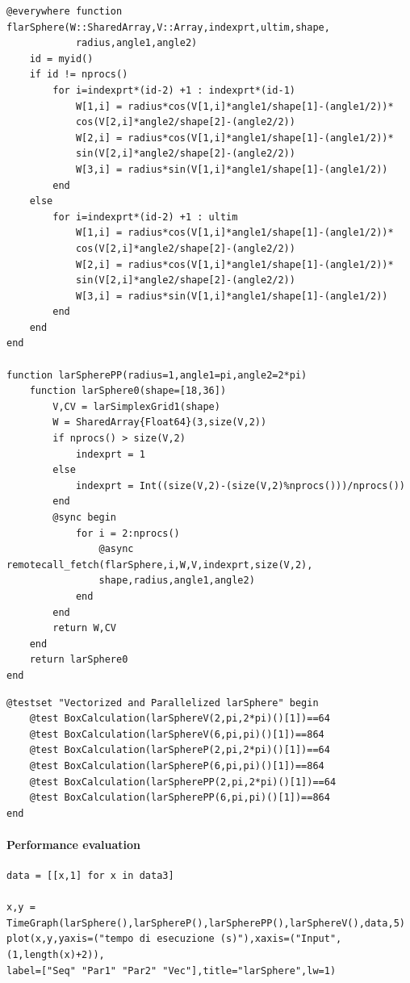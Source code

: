 \documentclass{article}
\begin{document}
\begin{Verbatim}
@everywhere function flarSphere(W::SharedArray,V::Array,indexprt,ultim,shape,
            radius,angle1,angle2)
    id = myid()
    if id != nprocs()
        for i=indexprt*(id-2) +1 : indexprt*(id-1)
            W[1,i] = radius*cos(V[1,i]*angle1/shape[1]-(angle1/2))*
            cos(V[2,i]*angle2/shape[2]-(angle2/2))
            W[2,i] = radius*cos(V[1,i]*angle1/shape[1]-(angle1/2))*
            sin(V[2,i]*angle2/shape[2]-(angle2/2))
            W[3,i] = radius*sin(V[1,i]*angle1/shape[1]-(angle1/2))
        end
    else
        for i=indexprt*(id-2) +1 : ultim
            W[1,i] = radius*cos(V[1,i]*angle1/shape[1]-(angle1/2))*
            cos(V[2,i]*angle2/shape[2]-(angle2/2))
            W[2,i] = radius*cos(V[1,i]*angle1/shape[1]-(angle1/2))*
            sin(V[2,i]*angle2/shape[2]-(angle2/2))
            W[3,i] = radius*sin(V[1,i]*angle1/shape[1]-(angle1/2))
        end
    end
end

function larSpherePP(radius=1,angle1=pi,angle2=2*pi)
    function larSphere0(shape=[18,36])
        V,CV = larSimplexGrid1(shape)
        W = SharedArray{Float64}(3,size(V,2))
        if nprocs() > size(V,2)
            indexprt = 1
        else
            indexprt = Int((size(V,2)-(size(V,2)%nprocs()))/nprocs())
        end
        @sync begin
            for i = 2:nprocs()
                @async remotecall_fetch(flarSphere,i,W,V,indexprt,size(V,2),
                shape,radius,angle1,angle2)
            end
        end
        return W,CV
    end
    return larSphere0    
end
\end{Verbatim}

\begin{Verbatim}
@testset "Vectorized and Parallelized larSphere" begin
    @test BoxCalculation(larSphereV(2,pi,2*pi)()[1])==64
    @test BoxCalculation(larSphereV(6,pi,pi)()[1])==864
    @test BoxCalculation(larSphereP(2,pi,2*pi)()[1])==64
    @test BoxCalculation(larSphereP(6,pi,pi)()[1])==864
    @test BoxCalculation(larSpherePP(2,pi,2*pi)()[1])==64
    @test BoxCalculation(larSpherePP(6,pi,pi)()[1])==864
end
\end{Verbatim}

\paragraph{Performance evaluation}

\begin{Verbatim}
data = [[x,1] for x in data3]

x,y = TimeGraph(larSphere(),larSphereP(),larSpherePP(),larSphereV(),data,5)
plot(x,y,yaxis=("tempo di esecuzione (s)"),xaxis=("Input",(1,length(x)+2)),
label=["Seq" "Par1" "Par2" "Vec"],title="larSphere",lw=1)

\end{Verbatim}
\end{document}
